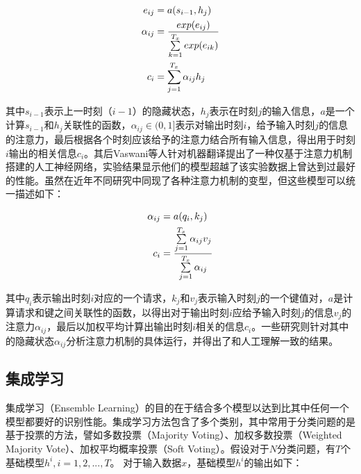 \vspace{-10mm}
\begin{equation}
\vspace{-2.5mm}
\begin{aligned}
  \label{eq:attention}
  e_{ij} &= a(s_{i - 1}, h_j) \\
  \alpha_{ij} &= \frac{exp(e_{ij})}{\sum\limits_{k=1}^{T_x}{exp(e_{ik})}} \\
  c_{i} &= \sum\limits_{j=1}^{T_x}{\alpha_{ij}h_j}
\end{aligned}
\end{equation}

其中$s_{i-1}$表示上一时刻（$i-1$）的隐藏状态，$h_j$表示在时刻$j$的输入信息，$a$是一个计算$s_{i - 1}$和$h_j$关联性的函数，$\alpha_{ij} \in (0, 1]$表示对输出时刻$i$，给予输入时刻$j$的信息的注意力，最后根据各个时刻应该给予的注意力结合所有输入信息，得出用于时刻$i$输出的相关信息$c_{i}$。其后Vaswani等人\cite{vaswani2017attention}针对机器翻译提出了一种仅基于注意力机制搭建的人工神经网络，实验结果显示他们的模型超越了该实验数据上曾达到过最好的性能。虽然在近年不同研究\cite{luong2015effective}\cite{graves2014neural}\cite{xu2015show}中同现了各种注意力机制的变型，但这些模型可以统一描述如下：

\vspace{-10mm}
\begin{equation}
\vspace{-2.5mm}
\begin{aligned}
  \alpha_{ij} &= a(q_i, k_j) \\
  c_i &= \frac
    {\sum\limits_{j=1}^{T_x}{\alpha_{ij}v_j}}
    {\sum\limits_{j=1}^{T_x}{\alpha_{ij}}}
\end{aligned}
\end{equation}

其中$q_i$表示输出时刻$i$对应的一个请求，$k_j$和$v_j$表示输入时刻$j$的一个键值对，$a$是计算请求和键之间关联性的函数，以得出对于输出时刻$i$应给予输入时刻$j$的信息$v_j$的注意力$\alpha_{ij}$，最后以加权平均计算出输出时刻$i$相关的信息$c_i$。一些研究\cite{wang2016attention}\cite{pontiki2014semeval}则针对其中的隐藏状态$\alpha_{ij}$分析注意力机制的具体运行，并得出了和人工理解一致的结果。

\subsection{集成学习}
\label{ssec:intro_ensemble_learning}

集成学习（Ensemble Learning）的目的在于结合多个模型以达到比其中任何一个模型都要好的识别性能。集成学习方法包含了多个类别，其中常用于分类问题的是基于投票的方法，譬如多数投票（Majority Voting）、加权多数投票（Weighted Majority Vote）、加权平均概率投票（Soft Voting）。假设对于$N$分类问题，有$T$个基础模型$h^i, i = 1,2,...,T$。
对于输入数据$x$，基础模型$h^i$的输出如下：

